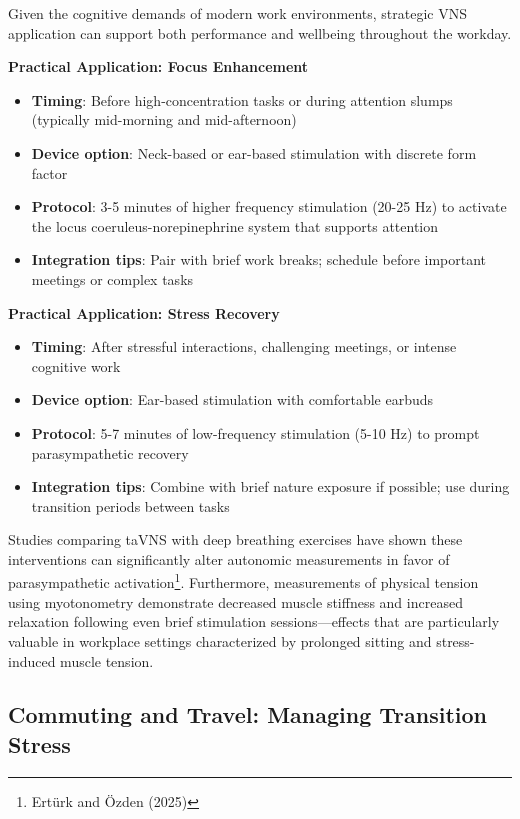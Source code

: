 \documentclass[
  Letterpaper,
]{scrbook}
\providecommand{\tightlist}{%
  \setlength{\itemsep}{0pt}\setlength{\parskip}{0pt}}\usepackage{longtable,booktabs,array}
\begin{document}
Given the cognitive demands of modern work environments, strategic VNS
application can support both performance and wellbeing throughout the
workday.

\textbf{Practical Application: Focus Enhancement}

\begin{itemize}
\tightlist
\item
  \textbf{Timing}: Before high-concentration tasks or during attention
  slumps (typically mid-morning and mid-afternoon)
\item
  \textbf{Device option}: Neck-based or ear-based stimulation with
  discrete form factor
\item
  \textbf{Protocol}: 3-5 minutes of higher frequency stimulation (20-25
  Hz) to activate the locus coeruleus-norepinephrine system that
  supports attention
\item
  \textbf{Integration tips}: Pair with brief work breaks; schedule
  before important meetings or complex tasks
\end{itemize}

\textbf{Practical Application: Stress Recovery}

\begin{itemize}
\tightlist
\item
  \textbf{Timing}: After stressful interactions, challenging meetings,
  or intense cognitive work
\item
  \textbf{Device option}: Ear-based stimulation with comfortable earbuds
\item
  \textbf{Protocol}: 5-7 minutes of low-frequency stimulation (5-10 Hz)
  to prompt parasympathetic recovery
\item
  \textbf{Integration tips}: Combine with brief nature exposure if
  possible; use during transition periods between tasks
\end{itemize}

Studies comparing taVNS with deep breathing exercises have shown these
interventions can significantly alter autonomic measurements in favor of
parasympathetic activation\footnote{Ertürk and Özden (2025)}.
Furthermore, measurements of physical tension using myotonometry
demonstrate decreased muscle stiffness and increased relaxation
following even brief stimulation sessions---effects that are
particularly valuable in workplace settings characterized by prolonged
sitting and stress-induced muscle tension.

\subsection{Commuting and Travel: Managing Transition
Stress}\label{commuting-and-travel-managing-transition-stress}
\end{document}
